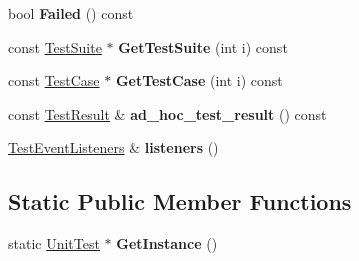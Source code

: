 \begin{DoxyCompactItemize}
bool {\bfseries Failed} () const
\item 
\mbox{\label{classtesting_1_1UnitTest_a9875be4cde301a6bef1788cdd65a0f84}} 
const \mbox{\hyperlink{classtesting_1_1TestSuite}{Test\+Suite}} $\ast$ {\bfseries Get\+Test\+Suite} (int i) const
\item 
\mbox{\label{classtesting_1_1UnitTest_a724d4c8be4481e0c1523a22b72dc7dac}} 
const \mbox{\hyperlink{classtesting_1_1TestSuite}{Test\+Case}} $\ast$ {\bfseries Get\+Test\+Case} (int i) const
\item 
\mbox{\label{classtesting_1_1UnitTest_aa59dde4c3dc43a920ed142a27670686c}} 
const \mbox{\hyperlink{classtesting_1_1TestResult}{Test\+Result}} \& {\bfseries ad\+\_\+hoc\+\_\+test\+\_\+result} () const
\item 
\mbox{\label{classtesting_1_1UnitTest_aac10085cf7c0d1751306db10cdd953cb}} 
\mbox{\hyperlink{classtesting_1_1TestEventListeners}{Test\+Event\+Listeners}} \& {\bfseries listeners} ()
\end{DoxyCompactItemize}
\subsection*{Static Public Member Functions}
\begin{DoxyCompactItemize}
\item 
\mbox{\label{classtesting_1_1UnitTest_a24192400b70b3b946746954e9574fb8e}} 
static \mbox{\hyperlink{classtesting_1_1UnitTest}{Unit\+Test}} $\ast$ {\bfseries Get\+Instance} ()
\end{DoxyCompactItemize}
